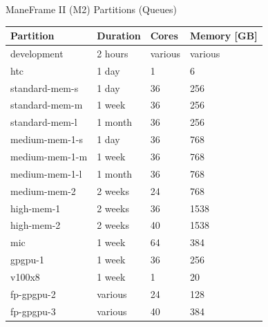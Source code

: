 \begin{frame}{ManeFrame II (M2) Partitions (Queues)}
\begin{table}
\tiny
\begin{tabular}{llll}
\toprule
Partition & Duration & Cores & Memory [GB]\\
\midrule
development & 2 hours & various & various\\
htc & 1 day & 1 & 6\\
standard-mem-s & 1 day & 36 & 256\\
standard-mem-m & 1 week & 36 & 256\\
standard-mem-l & 1 month & 36 & 256\\
medium-mem-1-s & 1 day & 36 & 768\\
medium-mem-1-m & 1 week & 36 & 768\\
medium-mem-1-l & 1 month & 36 & 768\\
medium-mem-2 & 2 weeks & 24 & 768\\
high-mem-1 & 2 weeks & 36 & 1538\\
high-mem-2 & 2 weeks & 40 & 1538\\
mic & 1 week & 64 & 384\\
gpgpu-1 & 1 week & 36 & 256\\
v100x8 & 1 week & 1 & 20\\
fp-gpgpu-2 & various & 24 & 128\\
fp-gpgpu-3 & various & 40 & 384\\
\bottomrule
\end{tabular}
\end{table}
\end{frame}

